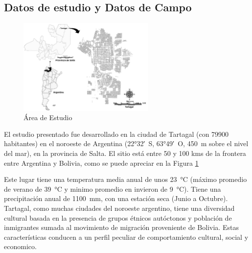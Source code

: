 \subsection{Datos de estudio y Datos de Campo}
  \begin{figure}
  \centering%
  \includegraphics[width=0.6\textwidth]{images/tartagal}%
  \caption{Área de Estudio}\label{fig:tartagal}
  \end{figure}

  \par El estudio presentado fue desarrollado en la ciudad de Tartagal
    (con 79900 habitantes) en el noroeste de Argentina
    (\ang{22;32;}~S, \ang{63;49;}~O, \SI{450}{\meter} sobre el nivel del mar),
    en la provincia de Salta. El sitio está entre 50 y 100 kms de la frontera
    entre Argentina y Bolivia, como se puede apreciar en la Figura \ref{fig:tartagal}

  \par Este lugar tiene una temperatura media anual de unos \SI{23}{\degreeCelsius}
    (máximo promedio de verano de \SI{39}{\degreeCelsius} y minimo promedio en
    invieron de \SI{9}{\degreeCelsius}). Tiene una precipitación anual de
    \SI{1100}{\milli\meter}, con una estación seca (Junio a Octubre).
    Tartagal, como muchas ciudades del noroeste argentino, tiene una diversidad
    cultural basada en la presencia de grupos étnicos autóctonos y población
    de inmigrantes sumada al movimiento de migración proveniente de Bolivia.
    Estas características conducen a un perfil peculiar de comportamiento
    cultural, social y economico.

